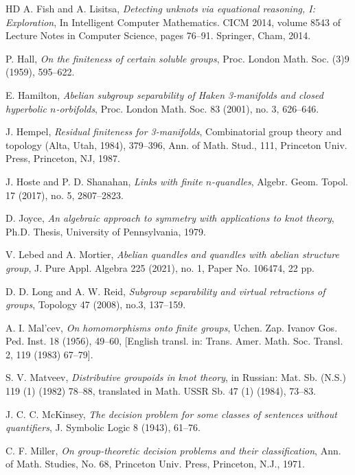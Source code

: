 \documentclass[12pt]{amsart}
\theoremstyle{definition}
\numberwithin{equation}{subsection}
\begin{document}
\begin{thebibliography}{HD}
 A. Fish and A. Lisitsa, \textit{Detecting unknots via equational reasoning, I: Exploration},	In Intelligent Computer Mathematics. CICM 2014, volume 8543 of Lecture Notes in Computer Science, pages 76--91. Springer, Cham, 2014.
	
 P. Hall, \textit{On the finiteness of certain soluble groups}, Proc. London Math. Soc. (3)9 (1959), 595--622.

 E. Hamilton, \textit{Abelian subgroup separability of Haken 3-manifolds and closed hyperbolic $n$-orbifolds}, Proc. London Math. Soc. 83 (2001), no. 3, 626--646.

 J. Hempel, \textit{Residual finiteness for 3-manifolds}, Combinatorial group theory and topology (Alta, Utah, 1984), 379--396, Ann. of Math. Stud., 111, Princeton Univ. Press, Princeton, NJ, 1987.
			
 J. Hoste and P. D. Shanahan, \textit{Links with finite $n$-quandles}, Algebr. Geom. Topol. 17 (2017), no. 5, 2807--2823.

 D. Joyce, \textit{An algebraic approach to symmetry with applications to knot theory}, Ph.D. Thesis, University of Pennsylvania, 1979.

 V. Lebed and A. Mortier, \textit{Abelian quandles and quandles with abelian structure group}, J. Pure Appl. Algebra 225 (2021), no. 1, Paper No. 106474, 22 pp.

 D. D. Long and A. W.  Reid,  \textit{Subgroup separability and virtual retractions of groups},  Topology 47 (2008), no.3, 137--159.

 A. I. Mal'cev, \textit{On homomorphisms onto finite groups}, Uchen. Zap. Ivanov Gos. Ped. Inst. 18 (1956), 49--60, [English transl. in: Trans. Amer. Math. Soc. Transl.
2, 119 (1983) 67--79].


 S. V. Matveev, \textit{Distributive groupoids in knot theory}, in Russian: Mat. Sb. (N.S.) 119 (1) (1982) 78--88, translated in Math. USSR Sb. 47 (1) (1984), 73--83.

 J. C. C. McKinsey, \textit{The decision problem for some classes of sentences without quantifiers}, J. Symbolic Logic 8 (1943), 61--76.

 C. F. Miller, \textit{On group-theoretic decision problems and their classification}, Ann. of Math. Studies, No. 68, Princeton Univ. Press, Princeton, N.J., 1971.


\end{thebibliography}
\end{document}
